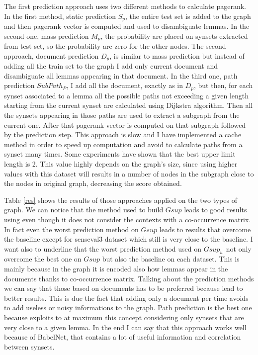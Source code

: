 \documentclass[0pt]{article}
\begin{document}
The first prediction approach uses two different methods to calculate pagerank. In the first method, static prediction $S_{p}$, the entire test set is added to the graph and then pagerank vector is computed and used to disambiguate lemmas. In the second one, mass prediction $M_{p}$, the probability are placed on synsets extracted from test set, so the probability are zero for the other nodes.
The second approach, document prediction $D_{p}$, is similar to mass prediction but instead of adding all the train set to the graph I add only current document and disambiguate all lemmas appearing in that document.
In the third one, path prediction $SubPath_{P}$, I add all the document, exactly as in $D_{p}$, but then, for each synset associated to a lemma all the possible paths not exceeding a given length starting from the current synset are calculated using Dijkstra algorithm. Then all the synsets appearing in those paths are used to extract a subgraph from the current one. After that pagerank vector is computed on that subgraph followed by the prediction step. This approach is slow and I have implemented a cache method in order to speed up computation and avoid to calculate paths from a synset many times. Some experiments have shown that the best upper limit length is 2. This value highly depends on the graph's size, since using higher values with this dataset will results in a number of nodes in the subgraph close to the nodes in original graph, decreasing the score obtained. 

Table \ref{res} shows the results of those approaches applied on the two types of graph. We can notice that the method used to build $Gsup$ leads to good results using even though it does not consider the contexts with a co-occurrence matrix. In fact even the worst prediction method on $Gsup$ leads to results that overcome the baseline except for senseval3 dataset which still is very close to the baseline. I want also to underline that the worst prediction method used on $Gsup_{w}$ not only overcome the best one on $Gsup$ but also the baseline on each dataset. This is mainly because in the graph it is encoded also how lemmas appear in the documents thanks to co-occurrence matrix.
Talking about the prediction methods we can say that those based on documents has to be preferred because lead to better results. This is due the fact that adding only a document per time avoids to add useless or noisy informations to the graph. Path prediction is the best one because exploits to at maximum this concept considering only synsets that are very close to a given lemma. In the end I can say that  this approach works well because of BabelNet, that contains a lot of useful information and correlation between synsets.
\end{document}
